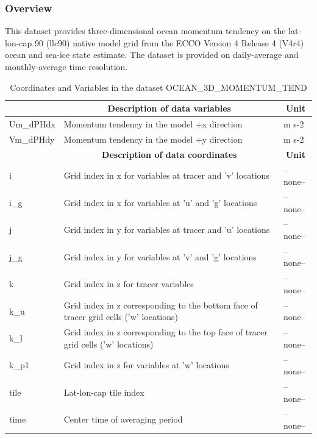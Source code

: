 \subsubsection{Overview}
This dataset provides three-dimensional ocean momentum tendency on the lat-lon-cap 90 (llc90) native model grid from the ECCO Version 4 Release 4 (V4r4) ocean and sea-ice state estimate. The dataset is provided on daily-average and monthly-average time resolution. 
\begin{longtable}{|m{}|m{}|m{}|}
\caption{Coordinates and Variables in the dataset OCEAN\_3D\_MOMENTUM\_TEND}
\label{tab:table-OCEAN_3D_MOMENTUM_TEND-fields} \\ 
\hline \endhead \hline \endfoot
\rowcolor{lightgray} \multicolumn{1}{|c|}{\textbf{Variables}} & \multicolumn{1}{|c|}{\textbf{Description of data variables}} &  \multicolumn{1}{|c|}{\textbf{Unit}}\\ \hline
Um\_dPHdx &Momentum tendency in the model +x direction &m s-2  \\ \hline
Vm\_dPHdy &Momentum tendency in the model +y direction &m s-2  \\ \hline
\rowcolor{lightgray} \multicolumn{1}{|c|}{\textbf{Coordinates}} & \multicolumn{1}{|c|}{\textbf{Description of data coordinates}} &  \multicolumn{1}{|c|}{\textbf{Unit}}\\ \hline
i &Grid index in x for variables at tracer and 'v' locations &--none--  \\ \hline
i\_g &Grid index in x for variables at 'u' and 'g' locations &--none--  \\ \hline
j &Grid index in y for variables at tracer and 'u' locations &--none--  \\ \hline
j\_g &Grid index in y for variables at 'v' and 'g' locations &--none--  \\ \hline
k &Grid index in z for tracer variables &--none--  \\ \hline
k\_u &Grid index in z corresponding to the bottom face of tracer grid cells ('w' locations) &--none--  \\ \hline
k\_l &Grid index in z corresponding to the top face of tracer grid cells ('w' locations) &--none--  \\ \hline
k\_p1 &Grid index in z for variables at 'w' locations &--none--  \\ \hline
tile &Lat-lon-cap tile index &--none--  \\ \hline
time &Center time of averaging period &--none--  \\ \hline

\end{longtable}
